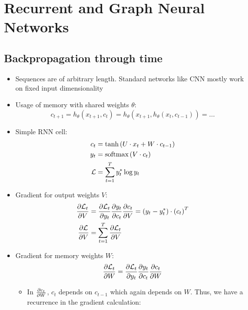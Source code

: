 \section{Recurrent and Graph Neural Networks}
\subsection{Backpropagation through time}
\begin{itemize}
	\item Sequences are of arbitrary length. Standard networks like CNN mostly work on fixed input dimensionality
	\item Usage of memory with shared weights $\theta$: $$c_{t+1} = h_{\theta}\left(x_{t+1}, c_{t}\right) = h_{\theta}\left(x_{t+1}, h_{\theta}\left(x_{t}, c_{t-1}\right)\right) = ...$$
	\item Simple RNN cell: 
	\begin{equation*}
		\begin{split}
			c_t & = \tanh\left(U\cdot x_t + W \cdot c_{t-1}\right) \\
			y_t & = \text{softmax}\left(V \cdot c_{t}\right) \\
			\mathcal{L} & = \sum\limits_{t=1}^{T} y_t^{*} \log y_t \\
		\end{split}
	\end{equation*}
	\item Gradient for output weights $V$:
	\begin{equation*}
		\begin{split}
			\frac{\partial \mathcal{L}_t}{\partial V} & = \frac{\partial \mathcal{L}_t}{\partial y_t}\frac{\partial y_t}{\partial c_t}\frac{\partial c_t}{\partial V} = \left(y_t - y_t^{*}\right) \cdot \left(c_t\right)^T\\
			\frac{\partial \mathcal{L}}{\partial V} & = \sum\limits_{t=1}^{T} \frac{\partial \mathcal{L}_t}{\partial V}\\
		\end{split}
	\end{equation*}
	\item Gradient for memory weights $W$: 
	\begin{equation*}
		\begin{split}
			\frac{\partial \mathcal{L}_t}{\partial W} & = \frac{\partial \mathcal{L}_t}{\partial y_t}\frac{\partial y_t}{\partial c_t}\frac{\partial c_t}{\partial W}\\
		\end{split}
	\end{equation*}
	\begin{itemize}
		\item In $\frac{\partial c_t}{\partial W}$, $c_t$ depends on $c_{t-1}$ which again depends on $W$. Thus, we have a recurrence in the gradient calculation:

\end{itemize}
\end{itemize}
